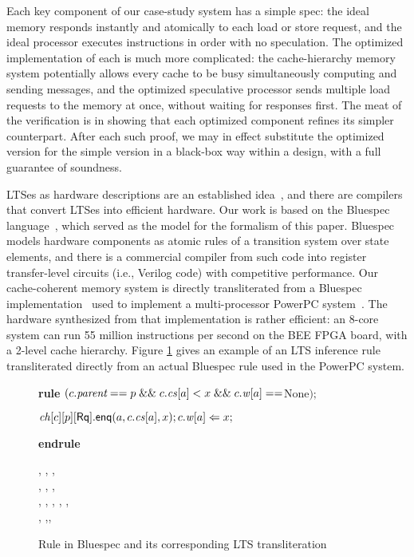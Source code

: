 Each key component of our case-study system has a simple spec: the
ideal memory responds instantly and atomically to each load or store
request, and the ideal processor executes instructions in order with
no speculation.  The optimized implementation of each is much more
complicated: the cache-hierarchy memory system potentially allows
every cache to be busy simultaneously computing and sending messages,
and the optimized speculative processor sends multiple load requests
to the memory at once, without waiting for responses first.  The meat
of the verification is in showing that each optimized component
refines its simpler counterpart.  After each such proof, we may in
effect substitute the optimized version for the simple version in a
black-box way within a design, with a full guarantee of soundness.

LTSes as hardware descriptions are an established
idea~\cite{HoeArvind:TRSSynthesis1, Hoe:TCAD}, and there are
compilers that convert LTSes into efficient hardware.  Our work is
based on the Bluespec language~\cite{BSV:LangRef, Bluespec:TFRG},
which served as the model for the formalism of this paper.  Bluespec
models hardware components as atomic rules of a transition system over
state elements, and there is a commercial compiler from such code into
register transfer-level circuits (i.e., Verilog code) with competitive
performance.  Our cache-coherent memory system is directly
transliterated from a Bluespec
implementation~\cite{DNA:CoherenceImplementation} used to
implement a multi-processor PowerPC system~\cite{Khan:PowerPc}. The
hardware synthesized from that implementation is rather efficient:
an 8-core system can run 55 million instructions per second on
the BEE FPGA board\cite{}, with a 2-level cache hierarchy. Figure \ref{both} gives an example
of an LTS inference rule transliterated directly from an actual Bluespec rule used
in the PowerPC system.

\begin{figure}[t]
\centering
\begin{boxedminipage}{\columnwidth}
\small
\noindent \textbf{rule} $(c.\textit{parent} == p \; \mathit{\&\&} \; c.\mathit{cs}[a] < x \; \mathit{\&\&} \; c.\mathit{w}[a]==$None$);$

\hspace{1cm} $\mathit{ch}[c][p][\mathsf{Rq}].\mathsf{enq}(a,c.\mathit{cs}[a],x); c.\mathit{w}[a] \Leftarrow x;$

\textbf{endrule}
\end{boxedminipage}
\begin{boxedminipage}{\columnwidth}
\small
{}
{
{\dt, \ch, \s,\\ \dst, \wt, \dwt,\\ \inp, \outp}
{\dt, , \s, \dst,\\
\wt[(c,a)\coloneqq x], \dwt,\inp, \outp}{}}
\end{boxedminipage}
\caption{Rule in Bluespec and its corresponding LTS transliteration}
\label{both}
\end{figure}

